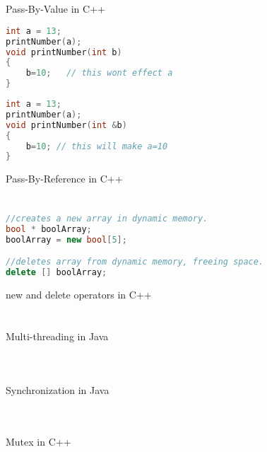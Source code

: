 \documentclass[]{report}
\begin{document}
\chapter{}
\begin{figure}[h!]
	\caption{Pass-By-Value in C++}
	\begin{lstlisting}[language=C++,frame=single]
int a = 13;
printNumber(a);
void printNumber(int b)
{
	b=10;	// this wont effect a
}
	\end{lstlisting}
	\caption{Pass-By-Reference in C++}
	\begin{lstlisting}[language=C++,frame=single]
int a = 13;
printNumber(a);
void printNumber(int &b)
{
	b=10; // this will make a=10
}
	\end{lstlisting}
\end{figure}

\chapter{}
\begin{figure}[h!]
	\caption{new and delete operators in C++}
	\begin{lstlisting}[language=C++,frame=single]
//creates a new array in dynamic memory.
bool * boolArray;
boolArray = new bool[5]; 

//deletes array from dynamic memory, freeing space.
delete [] boolArray; 
	\end{lstlisting}
\end{figure}

\chapter{}
\begin{figure}[h!]
	\caption{Multi-threading in Java}
	\begin{lstlisting}[language=Java,frame=single]

	\end{lstlisting}
	\caption{Synchronization in Java}
	\begin{lstlisting}[language=Java,frame=single]
	
	\end{lstlisting}
\end{figure}

\chapter{}
\begin{figure}[h!]
	\caption{Mutex in C++}
	\begin{lstlisting}[language=C++,frame=single]

	\end{lstlisting}
\end{figure}
\end{document}
